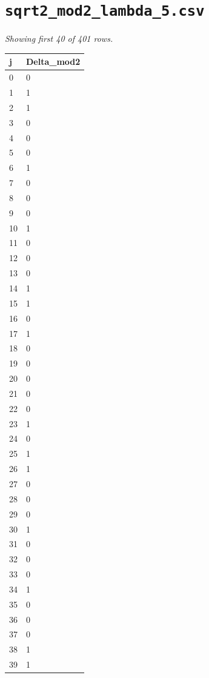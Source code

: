 \documentclass[10pt]{article}
\begin{document}
\section*{\texttt{sqrt2\_mod2\_lambda\_5.csv}}
\noindent\textit{Showing first 40 of 401 rows.}\par\medskip
{\footnotesize
\begin{longtable}{@{}ll@{}}
\toprule
\textbf{j} & \textbf{Delta\_mod2} \\
\midrule\endhead
0 & 0 \\
1 & 1 \\
2 & 1 \\
3 & 0 \\
4 & 0 \\
5 & 0 \\
6 & 1 \\
7 & 0 \\
8 & 0 \\
9 & 0 \\
10 & 1 \\
11 & 0 \\
12 & 0 \\
13 & 0 \\
14 & 1 \\
15 & 1 \\
16 & 0 \\
17 & 1 \\
18 & 0 \\
19 & 0 \\
20 & 0 \\
21 & 0 \\
22 & 0 \\
23 & 1 \\
24 & 0 \\
25 & 1 \\
26 & 1 \\
27 & 0 \\
28 & 0 \\
29 & 0 \\
30 & 1 \\
31 & 0 \\
32 & 0 \\
33 & 0 \\
34 & 1 \\
35 & 0 \\
36 & 0 \\
37 & 0 \\
38 & 1 \\
39 & 1 \\
\bottomrule
\end{longtable}}
\end{document}
